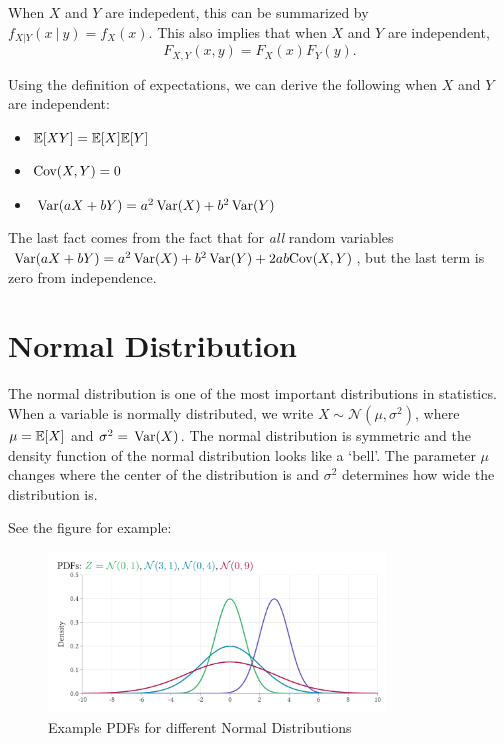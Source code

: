 \documentclass[12pt]{article}
\begin{document}
When $X$ and $Y$ are indepedent, this can be summarized by $f_{X \vert Y}(x \ \vert \ y) = f_{X}(x)$. This also implies that when $X$ and $Y$ are independent,
$$
  F_{X,Y}(x, y) = F_{X}(x) F_{Y}(y).
$$

Using the definition of expectations, we can derive the following when $X$ and $Y$ are independent:
\begin{itemize}
  \item $\expec{XY} = \expec{X} \expec{Y}$
  \item $\cov(X, Y) = 0$
  \item $\var{aX + bY} = a^2 \var{X} + b^2 \var{Y}$
\end{itemize}

The last fact comes from the fact that for \emph{all} random variables $\var{aX + bY} = a^2 \var{X} + b^2 \var{Y} + 2ab \cov(X, Y)$, but the last term is zero from independence.


\section{Normal Distribution}

The normal distribution is one of the most important distributions in statistics. When a variable is normally distributed, we write $X \sim \mathcal{N}(\mu, \sigma^2)$, where $\mu = \expec{X}$ and $\sigma^2 = \var{X}$. The normal distribution is symmetric and the density function of the normal distribution looks like a `bell'. The parameter $\mu$ changes where the center of the distribution is and $\sigma^2$ determines how wide the distribution is.


See the figure for example:
\begin{figure}
  \caption{Example PDFs for different Normal Distributions}
  \begin{center}
    \includegraphics[width=0.8\textwidth]{figures/ex_normal_dist.pdf}
  \end{center}
\end{figure}
\end{document}
